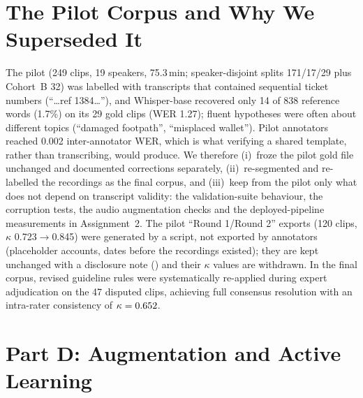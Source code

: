 \documentclass[sigconf,authordraft]{acmart}
\begin{document}
\section{The Pilot Corpus and Why We Superseded It}\label{sec:pilot}
The pilot (249 clips, 19 speakers, 75.3\,min; speaker-disjoint splits 171/17/29 plus Cohort~B 32) was labelled with transcripts that contained sequential ticket numbers (``\ldots ref 1384\ldots''), and Whisper-base recovered only 14 of 838 reference words (1.7\%) on its 29 gold clips (WER 1.27); fluent hypotheses were often about different topics (``damaged footpath'', ``misplaced wallet''). Pilot annotators reached 0.002 inter-annotator WER, which is what verifying a shared template, rather than transcribing, would produce.
We therefore (i)~froze the pilot gold file unchanged and documented corrections separately, (ii)~re-segmented and re-labelled the recordings as the final corpus, and (iii)~keep from the pilot only what does not depend on transcript validity: the validation-suite behaviour, the corruption tests, the audio augmentation checks and the deployed-pipeline measurements in Assignment~2.
The pilot ``Round 1/Round 2'' exports (120 clips, $\kappa$ 0.723$\to$0.845) were generated by a script, not exported by annotators (placeholder accounts, dates before the recordings existed); they are kept unchanged with a disclosure note () and their $\kappa$ values are withdrawn. In the final corpus, revised guideline rules were systematically re-applied during expert adjudication on the 47 disputed clips, achieving full consensus resolution with an intra-rater consistency of $\kappa=0.652$.

\section{Part D: Augmentation and Active Learning}\label{sec:aug}
\end{document}
